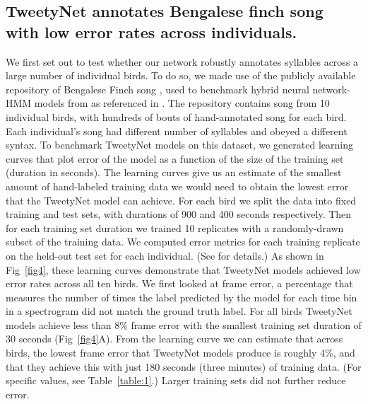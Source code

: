 \documentclass[10pt,letterpaper]{article}
\begin{document}
\subsection*{TweetyNet annotates Bengalese finch song with low error rates across individuals.}
We first set out to test whether our network robustly annotates syllables across a large number of
individual birds. To do so, we made use of the  
publicly available repository of Bengalese Finch song \cite{koumura_birdsongrecognition_2016},
used to benchmark hybrid neural network-HMM models from \cite{koumura_automatic_2016-1} 
as referenced in . 
The repository contains song from 10 individual birds, with hundreds of bouts of hand-annotated 
song for each bird. Each individual's song had different number of syllables and obeyed a different syntax.
To benchmark TweetyNet models on this dataset, we generated learning curves that plot error of the 
model as a function of the size of the training set (duration in seconds). 
The learning curves give us an estimate of the smallest amount of hand-labeled training data 
we would need to obtain the lowest error that the TweetyNet model can achieve.
For each bird we split the data into fixed training and test sets, 
with durations of 900 and 400 seconds respectively.
Then for each training set duration we trained 10
replicates with a randomly-drawn subset of the training data. 
We computed error metrics for each training replicate on the 
held-out test set for each individual. (See  for details.)
As shown in Fig~\ref{fig4}, these learning curves 
demonstrate that TweetyNet models achieved low error rates across all ten birds.
We first looked at frame error, a percentage that measures the number of times the label 
predicted by the model for each time bin in a spectrogram 
did not match the ground truth label.
For all birds %
TweetyNet models achieve less than 8\% frame error with the smallest training set duration 
of 30 seconds (Fig~\ref{fig4}A). 
From the learning curve we can estimate that across birds, the lowest frame error 
that TweetyNet models produce is roughly 4\%, and that they achieve this with just 
180 seconds (three minutes) of training data. (For specific values, see Table~\ref{table:1}.)
Larger training sets did not further reduce error.
\end{document}
